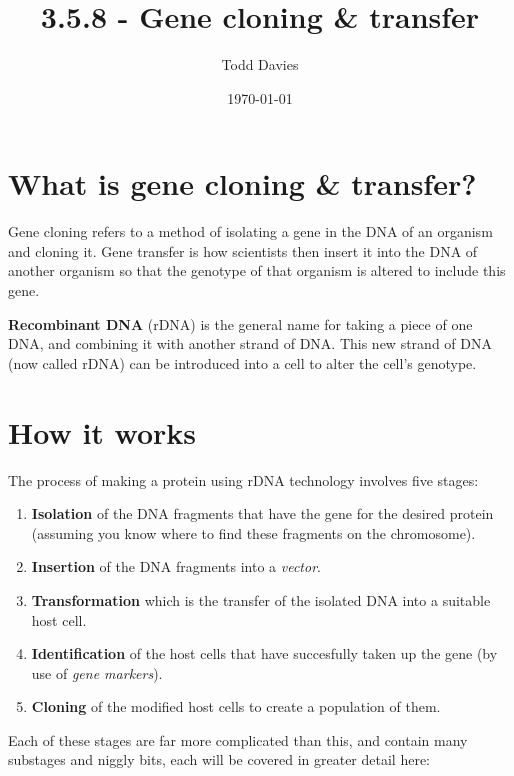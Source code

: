 \documentclass{article}
\title{3.5.8 - Gene cloning \& transfer}
\author{Todd Davies}
\date{\today}
\begin{document}
\lhead{\today}

\maketitle

\section*{What is gene cloning \& transfer?}
\thispagestyle{empty}

Gene cloning refers to a method of isolating a gene in the DNA of an organism
and cloning it. Gene transfer is how scientists then insert it into the DNA of
another organism so that the genotype of that organism is altered to include
this gene.

{\bf Recombinant DNA} (rDNA) is the general name for taking a piece of one DNA,
and combining it with another strand of DNA. This new strand of DNA (now
called rDNA) can be introduced into a cell to alter the cell's genotype.

\section*{How it works}

The process of making a protein using rDNA technology involves five stages:

\begin{enumerate}

	\item {\bf Isolation} of the DNA fragments that have the gene for the
	desired protein (assuming you know where to find these fragments on the
	chromosome).

	\item {\bf Insertion} of the DNA fragments into a {\it vector}.

	\item {\bf Transformation} which is the transfer of the isolated DNA into a
	suitable host cell.

	\item {\bf Identification} of the host cells that have succesfully taken up
	the gene (by use of {\it gene markers}).

	\item {\bf Cloning} of the modified host cells to create a population of
	them.

\end{enumerate}

Each of these stages are far more complicated than this, and contain many substages and niggly bits, each will
be covered in greater detail here:
\end{document}
